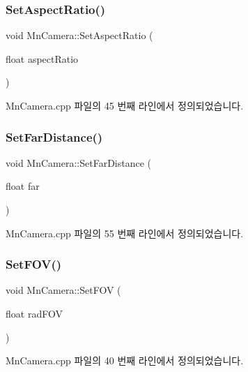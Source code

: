 \subsubsection{\texorpdfstring{Set\+Aspect\+Ratio()}{SetAspectRatio()}}
{\footnotesize\ttfamily void Mn\+Camera\+::\+Set\+Aspect\+Ratio (\begin{DoxyParamCaption}\item[{float}]{aspect\+Ratio }\end{DoxyParamCaption})}



Mn\+Camera.\+cpp 파일의 45 번째 라인에서 정의되었습니다.

\mbox{\label{class_m_n_l_1_1_mn_camera_ab7c4cbd91462c20e32ac2b80aa83474c}} 
\subsubsection{\texorpdfstring{Set\+Far\+Distance()}{SetFarDistance()}}
{\footnotesize\ttfamily void Mn\+Camera\+::\+Set\+Far\+Distance (\begin{DoxyParamCaption}\item[{float}]{far }\end{DoxyParamCaption})}



Mn\+Camera.\+cpp 파일의 55 번째 라인에서 정의되었습니다.

\mbox{\label{class_m_n_l_1_1_mn_camera_a624327e866968d1df7fb73d2019d6aab}} 
\subsubsection{\texorpdfstring{Set\+F\+O\+V()}{SetFOV()}}
{\footnotesize\ttfamily void Mn\+Camera\+::\+Set\+F\+OV (\begin{DoxyParamCaption}\item[{float}]{rad\+F\+OV }\end{DoxyParamCaption})}



Mn\+Camera.\+cpp 파일의 40 번째 라인에서 정의되었습니다.

